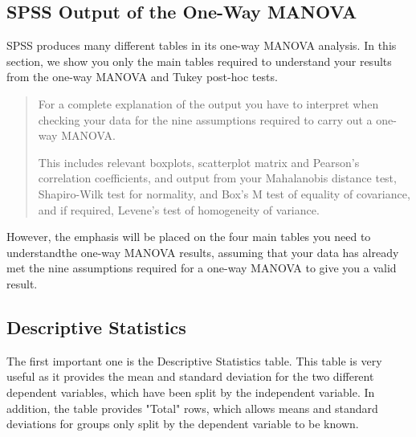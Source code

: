 \documentclass[12pt]{article} %
\begin{document}
%
%
%
%
%
%
%
%
%
\newpage
\subsection{SPSS Output of the One-Way MANOVA}
SPSS produces many different tables in its one-way MANOVA analysis. In this section, we show you only the main tables required to understand your results from the one-way MANOVA and Tukey post-hoc tests.

\begin{quote}
For a complete explanation of the output you have to interpret when checking your data for the nine assumptions required to carry out a one-way MANOVA.

This includes relevant boxplots, scatterplot matrix and Pearson's correlation coefficients, and output from your Mahalanobis distance test, Shapiro-Wilk test for normality, and Box's M test of equality of covariance, and if required, Levene's test of homogeneity of variance.
\end{quote}
However, the emphasis will be placed on the four main tables you need to understandthe one-way MANOVA results, assuming that your data has already met the nine assumptions required for a one-way MANOVA to give you a valid result.



\subsection{Descriptive Statistics}
The first important one is the Descriptive Statistics table. This table is very useful as it provides the mean and standard deviation for the two different dependent variables, which have been split by the independent variable. In addition, the table provides "Total" rows, which allows means and standard deviations for groups only split by the dependent variable to be known.
\end{document}

